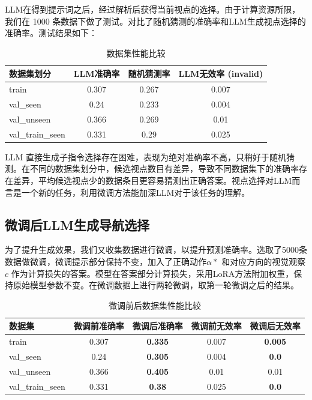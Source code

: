 \documentclass[bachelor]{thesis-uestc}
\begin{document}


LLM在得到提示词之后，经过解析后获得当前视点的选择。由于计算资源所限，我们在 1000 条数据下做了测试。对比了随机猜测的准确率和LLM生成视点选择的准确率。测试结果如下：

\begin{table}[h]
    \centering
    \caption{数据集性能比较}
    \begin{tabular}{@{}lccc@{}}
    \toprule
    数据集划分 & LLM准确率 & 随机猜测率 & LLM无效率 (invalid) \\ \midrule
    train & 0.307 & 0.267 & 0.007 \\
    val\_seen & 0.24 & 0.233 & 0.004 \\
    val\_unseen & 0.366 & 0.269 & 0.01 \\
    val\_train\_seen & 0.331 & 0.29 & 0.025 \\ \bottomrule
    \end{tabular}
    
\end{table}

LLM 直接生成子指令选择存在困难，表现为绝对准确率不高，只稍好于随机猜测。在不同的数据集划分中，候选视点数目有差异，导致不同数据集下的准确率存在差异，平均候选视点少的数据条目更容易猜测出正确答案。视点选择对LLM而言是一个新的任务，利用微调方法能加深LLM对于该任务的理解。

\subsection{微调后LLM生成导航选择}

为了提升生成效果，我们又收集数据进行微调，以提升预测准确率。选取了5000条数据做微调，微调提示部分保持不变，加入了正确动作$\alpha*$  和对应方向的视觉观察$c$ 作为计算损失的答案。模型在答案部分计算损失，采用LoRA方法附加权重，保持原始模型参数不变。在微调数据上进行两轮微调，取第一轮微调之后的结果。

\begin{table}[h]
    \centering
    \caption{微调前后数据集性能比较}
    \begin{tabular}{@{}lcccc@{}}
    \toprule
    数据集 & 微调前准确率  & 微调后准确率  & 微调前无效率 & 微调后无效率 \\ \midrule
    train          & 0.307 & \textbf{0.335} & 0.007 & \textbf{0.005} \\
    val\_seen      & 0.24  & \textbf{0.305} & 0.004 & \textbf{0.0}   \\
    val\_unseen    & 0.366 & \textbf{0.405} & 0.01  & 0.01  \\
    val\_train\_seen & 0.331 & \textbf{0.38}  & 0.025 & \textbf{0.0}   \\ \bottomrule
    \end{tabular}
    \end{table}
\end{document}

